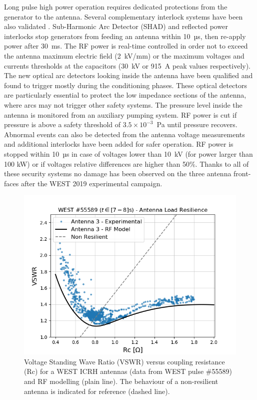 {Long pulse high power operation requires dedicated protections from the generator to the antenna. Several complementary interlock systems have been also validated \cite{helou2019}. Sub-Harmonic Arc Detector (SHAD) and reflected power interlocks stop generators from feeding an antenna within 10~µs, then re-apply power after 30~ms. The RF power is real-time controlled in order not to exceed the antenna maximum electric field (2~kV/mm) or the maximum voltages and currents thresholds at the capacitors (30~kV or 915~A peak values respectively). The new optical arc detectors looking inside the antenna have been qualified and found to trigger mostly during the conditioning phases. These optical detectors are particularly essential to protect the low impedance sections of the antenna, where arcs may not trigger other safety systems. The pressure level inside the antenna is monitored from an auxiliary pumping system.  RF power is cut if pressure is above a safety threshold of $3.5\times10^{-3}$~Pa until pressure recovers. Abnormal events can also be detected from the antenna voltage measurements and additional interlocks have been added for safer operation. RF power is stopped within 10~µs in case of voltages lower than 10~kV (for power larger than 100 kW) or if voltages relative differences are higher than 50\%. Thanks to all of these security systems no damage has been observed on the three antenna front-faces after the WEST 2019 experimental campaign.

\begin{figure}[h]
	\centering
	\includegraphics[width=0.7\linewidth]{figures/chap3/WEST_ICRH/WEST_ICRH_VSWR_vs_Rc}
	\caption{Voltage Standing Wave Ratio (VSWR) versus coupling resistance (Rc) for a WEST ICRH antennas (data from WEST pulse \#55589) and RF modelling (plain line). The behaviour of a non-resilient antenna is indicated for reference (dashed line).}
	\label{fig:westicrhvswrvsrc}
\end{figure}

}
